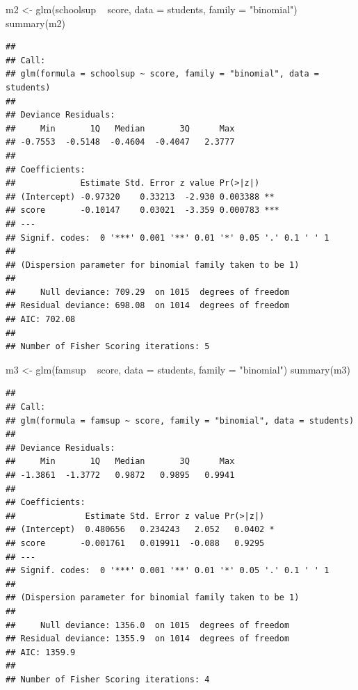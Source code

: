 \documentclass[]{article}
\newenvironment{Shaded}{\begin{snugshade}}{\end{snugshade}}
\newcommand{\DataTypeTok}[1]{\textcolor[rgb]{0.87,0.87,0.75}{#1}}
\newcommand{\KeywordTok}[1]{\textcolor[rgb]{0.94,0.87,0.69}{#1}}
\newcommand{\NormalTok}[1]{\textcolor[rgb]{0.80,0.80,0.80}{#1}}
\newcommand{\OperatorTok}[1]{\textcolor[rgb]{0.94,0.94,0.82}{#1}}
\newcommand{\StringTok}[1]{\textcolor[rgb]{0.80,0.58,0.58}{#1}}
\begin{document}
\begin{Shaded}
\begin{Highlighting}[]
\NormalTok{m2 <-}\StringTok{ }\KeywordTok{glm}\NormalTok{(schoolsup }\OperatorTok{~}\StringTok{ }\NormalTok{score, }\DataTypeTok{data =}\NormalTok{ students, }\DataTypeTok{family =} \StringTok{"binomial"}\NormalTok{)}
\KeywordTok{summary}\NormalTok{(m2)}
\end{Highlighting}
\end{Shaded}

\begin{verbatim}
## 
## Call:
## glm(formula = schoolsup ~ score, family = "binomial", data = students)
## 
## Deviance Residuals: 
##     Min       1Q   Median       3Q      Max  
## -0.7553  -0.5148  -0.4604  -0.4047   2.3777  
## 
## Coefficients:
##             Estimate Std. Error z value Pr(>|z|)    
## (Intercept) -0.97320    0.33213  -2.930 0.003388 ** 
## score       -0.10147    0.03021  -3.359 0.000783 ***
## ---
## Signif. codes:  0 '***' 0.001 '**' 0.01 '*' 0.05 '.' 0.1 ' ' 1
## 
## (Dispersion parameter for binomial family taken to be 1)
## 
##     Null deviance: 709.29  on 1015  degrees of freedom
## Residual deviance: 698.08  on 1014  degrees of freedom
## AIC: 702.08
## 
## Number of Fisher Scoring iterations: 5
\end{verbatim}

\begin{Shaded}
\begin{Highlighting}[]
\NormalTok{m3 <-}\StringTok{ }\KeywordTok{glm}\NormalTok{(famsup }\OperatorTok{~}\StringTok{ }\NormalTok{score, }\DataTypeTok{data =}\NormalTok{ students, }\DataTypeTok{family =} \StringTok{"binomial"}\NormalTok{)}
\KeywordTok{summary}\NormalTok{(m3)}
\end{Highlighting}
\end{Shaded}

\begin{verbatim}
## 
## Call:
## glm(formula = famsup ~ score, family = "binomial", data = students)
## 
## Deviance Residuals: 
##     Min       1Q   Median       3Q      Max  
## -1.3861  -1.3772   0.9872   0.9895   0.9941  
## 
## Coefficients:
##              Estimate Std. Error z value Pr(>|z|)  
## (Intercept)  0.480656   0.234243   2.052   0.0402 *
## score       -0.001761   0.019911  -0.088   0.9295  
## ---
## Signif. codes:  0 '***' 0.001 '**' 0.01 '*' 0.05 '.' 0.1 ' ' 1
## 
## (Dispersion parameter for binomial family taken to be 1)
## 
##     Null deviance: 1356.0  on 1015  degrees of freedom
## Residual deviance: 1355.9  on 1014  degrees of freedom
## AIC: 1359.9
## 
## Number of Fisher Scoring iterations: 4
\end{verbatim}
\end{document}
